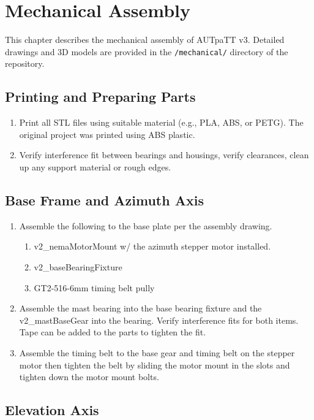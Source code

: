 \chapter{Mechanical Assembly}

This chapter describes the mechanical assembly of AUTpaTT v3. Detailed drawings and 3D models are provided in the \texttt{/mechanical/} directory of the repository.

\section{Printing and Preparing Parts}

\begin{enumerate}
  \item Print all STL files using suitable material (e.g., PLA, ABS, or PETG). The original project was printed using ABS plastic.
  \item Verify interference fit between bearings and housings, verify clearances, clean up any support material or rough edges.
\end{enumerate}

\section{Base Frame and Azimuth Axis}

\begin{enumerate}
  \item Assemble the following to the base plate per the assembly drawing.
    \begin{enumerate}

        \item v2\_nemaMotorMount w/ the azimuth stepper motor installed.
        \item v2\_baseBearingFixture
        \item GT2-516-6mm timing belt pully
    \end{enumerate}
  \item Assemble the mast bearing into the base bearing fixture and the v2\_mastBaseGear into the bearing. Verify interference fits for both items. Tape can be added to the parts to tighten the fit.
  \item Assemble the timing belt to the base gear and timing belt on the stepper motor then tighten the belt by sliding the motor mount in the slots and tighten down the motor mount bolts.
\end{enumerate}

\section{Elevation Axis}

